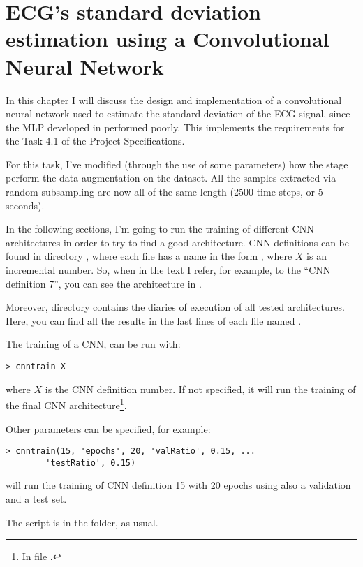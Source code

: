 \chapter{ECG's standard deviation estimation using a Convolutional Neural
Network}\label{ch:cnn}

In this chapter I will discuss the design and implementation of a convolutional
neural network used to estimate the standard deviation of the ECG signal, since
the MLP developed in  performed poorly. This implements the
requirements for the Task 4.1 of the Project Specifications.

For this task, I've modified (through the use of some parameters) how the
 stage perform the data augmentation on the dataset. All the
samples extracted via random subsampling are now all of the same length (2500
time steps, or 5 seconds).

In the following sections, I'm going to run the training of different CNN
architectures in order to try to find a good architecture. CNN definitions can
be found in directory , where each file has a name in the
form , where \(X\) is an incremental number. So, when in the
text I refer, for example, to the ``CNN definition 7'', you can see the
architecture in .

Moreover, directory  contains the diaries of execution of all
tested architectures. Here, you can find all the results in the last lines of
each file named .

The training of a CNN, can be run with:
\begin{verbatim}
> cnntrain X
\end{verbatim}
where \(X\) is the CNN definition number. If not specified, it will run the
training of the final CNN architecture\footnote{In file
.}.

Other parameters can be specified, for example:
\begin{verbatim}
> cnntrain(15, 'epochs', 20, 'valRatio', 0.15, ...
        'testRatio', 0.15)
\end{verbatim}
will run the training of CNN definition 15 with 20 epochs using also a
validation and a test set.

The script  is in the  folder, as usual.










